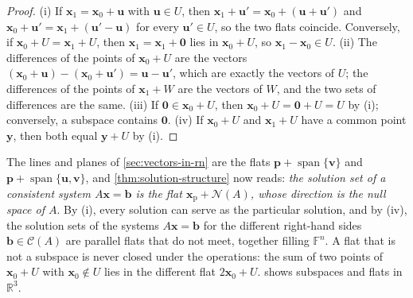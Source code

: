 \begin{proof}
(i) If $\mathbf x_1=\mathbf x_0+\mathbf u$ with $\mathbf u\in U$, then $\mathbf x_1+\mathbf u'=\mathbf x_0+(\mathbf u+\mathbf u')$ and $\mathbf x_0+\mathbf u'=\mathbf x_1+(\mathbf u'-\mathbf u)$ for every $\mathbf u'\in U$, so the two flats coincide. Conversely, if $\mathbf x_0+U=\mathbf x_1+U$, then $\mathbf x_1=\mathbf x_1+\mathbf 0$ lies in $\mathbf x_0+U$, so $\mathbf x_1-\mathbf x_0\in U$. (ii) The differences of the points of $\mathbf x_0+U$ are the vectors $(\mathbf x_0+\mathbf u)-(\mathbf x_0+\mathbf u')=\mathbf u-\mathbf u'$, which are exactly the vectors of $U$; the differences of the points of $\mathbf x_1+W$ are the vectors of $W$, and the two sets of differences are the same. (iii) If $\mathbf 0\in\mathbf x_0+U$, then $\mathbf x_0+U=\mathbf 0+U=U$ by (i); conversely, a subspace contains $\mathbf 0$. (iv) If $\mathbf x_0+U$ and $\mathbf x_1+U$ have a common point $\mathbf y$, then both equal $\mathbf y+U$ by (i).
\end{proof}

The lines and planes of \cref{sec:vectors-in-rn} are the flats $\mathbf p+\operatorname{span}\{\mathbf v\}$ and $\mathbf p+\operatorname{span}\{\mathbf u,\mathbf v\}$, and \cref{thm:solution-structure} now reads: \emph{the solution set of a consistent system $A\mathbf x=\mathbf b$ is the flat $\mathbf x_{\mathrm p}+\mathcal N(A)$, whose direction is the null space of $A$}. By (i), every solution can serve as the particular solution, and by (iv), the solution sets of the systems $A\mathbf x=\mathbf b$ for the different right-hand sides $\mathbf b\in\mathcal C(A)$ are parallel flats that do not meet, together filling $\mathbb F^n$. A flat that is not a subspace is never closed under the operations: the sum of two points of $\mathbf x_0+U$ with $\mathbf x_0\notin U$ lies in the different flat $2\mathbf x_0+U$.  shows subspaces and flats in $\mathbb R^3$.

